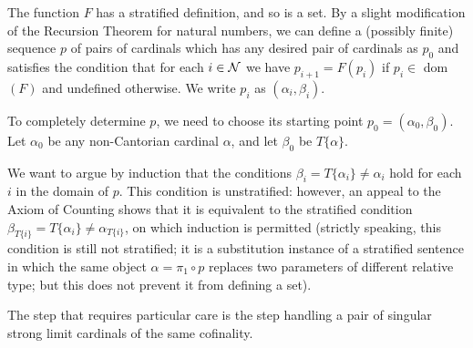 The function $F$ has a stratified definition, and so is a set.  By a
slight modification of the Recursion Theorem for natural numbers, we
can define a (possibly finite) sequence $p$ of pairs of
cardinals which has any desired pair of cardinals as $p_0$ and satisfies the
condition that for each $i \in {\cal N}$ we have $p_{i+1}=F(p_i)$ if
$p_i \in $ dom$(F)$ and undefined otherwise.  We write $p_i$ as
$(\alpha_i,\beta_i)$.

To completely determine $p$, we need to choose its starting point $p_0
= (\alpha_0,\beta_0)$.  Let $\alpha_0$ be any
non-Cantorian cardinal $\alpha$, and let
$\beta_0$ be $T\{\alpha\}$. 

We want to argue by induction that the conditions $\beta_i = 
T\{\alpha_i\} \neq \alpha_i$ hold for each $i$ in the domain of $p$.  This
condition is unstratified:  however, an appeal to the Axiom of Counting shows
that it is equivalent to the stratified condition $\beta_{T\{i\}} =
T\{\alpha_i\} \neq \alpha_{T\{i\}}$, on which induction is permitted (strictly
speaking, this condition is still not stratified; it is a substitution instance
of a stratified sentence in which the same object $\alpha = \pi_1 \circ p$
replaces two parameters of different relative type; but this does not prevent
it from defining a set).

The step that requires particular care is the step handling a pair of
singular strong limit cardinals of the same cofinality.

